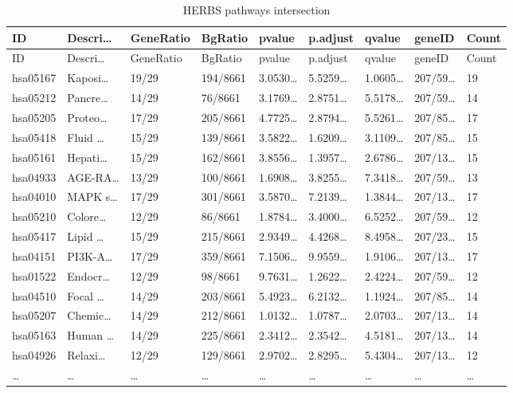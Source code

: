 \documentclass[
]{article}
\begin{document}
\begin{longtable}[]{@{}lllllllll@{}}
\caption{\label{tab:HERBS-pathways-intersection}HERBS pathways intersection}\tabularnewline
\toprule
ID & Descri\ldots{} & GeneRatio & BgRatio & pvalue & p.adjust & qvalue & geneID & Count\tabularnewline
\midrule
\endfirsthead
\toprule
ID & Descri\ldots{} & GeneRatio & BgRatio & pvalue & p.adjust & qvalue & geneID & Count\tabularnewline
\midrule
\endhead
hsa05167 & Kaposi\ldots{} & 19/29 & 194/8661 & 3.0530\ldots{} & 5.5259\ldots{} & 1.0605\ldots{} & 207/59\ldots{} & 19\tabularnewline
hsa05212 & Pancre\ldots{} & 14/29 & 76/8661 & 3.1769\ldots{} & 2.8751\ldots{} & 5.5178\ldots{} & 207/59\ldots{} & 14\tabularnewline
hsa05205 & Proteo\ldots{} & 17/29 & 205/8661 & 4.7725\ldots{} & 2.8794\ldots{} & 5.5261\ldots{} & 207/85\ldots{} & 17\tabularnewline
hsa05418 & Fluid \ldots{} & 15/29 & 139/8661 & 3.5822\ldots{} & 1.6209\ldots{} & 3.1109\ldots{} & 207/85\ldots{} & 15\tabularnewline
hsa05161 & Hepati\ldots{} & 15/29 & 162/8661 & 3.8556\ldots{} & 1.3957\ldots{} & 2.6786\ldots{} & 207/13\ldots{} & 15\tabularnewline
hsa04933 & AGE-RA\ldots{} & 13/29 & 100/8661 & 1.6908\ldots{} & 3.8255\ldots{} & 7.3418\ldots{} & 207/59\ldots{} & 13\tabularnewline
hsa04010 & MAPK s\ldots{} & 17/29 & 301/8661 & 3.5870\ldots{} & 7.2139\ldots{} & 1.3844\ldots{} & 207/13\ldots{} & 17\tabularnewline
hsa05210 & Colore\ldots{} & 12/29 & 86/8661 & 1.8784\ldots{} & 3.4000\ldots{} & 6.5252\ldots{} & 207/59\ldots{} & 12\tabularnewline
hsa05417 & Lipid \ldots{} & 15/29 & 215/8661 & 2.9349\ldots{} & 4.4268\ldots{} & 8.4958\ldots{} & 207/23\ldots{} & 15\tabularnewline
hsa04151 & PI3K-A\ldots{} & 17/29 & 359/8661 & 7.1506\ldots{} & 9.9559\ldots{} & 1.9106\ldots{} & 207/13\ldots{} & 17\tabularnewline
hsa01522 & Endocr\ldots{} & 12/29 & 98/8661 & 9.7631\ldots{} & 1.2622\ldots{} & 2.4224\ldots{} & 207/59\ldots{} & 12\tabularnewline
hsa04510 & Focal \ldots{} & 14/29 & 203/8661 & 5.4923\ldots{} & 6.2132\ldots{} & 1.1924\ldots{} & 207/85\ldots{} & 14\tabularnewline
hsa05207 & Chemic\ldots{} & 14/29 & 212/8661 & 1.0132\ldots{} & 1.0787\ldots{} & 2.0703\ldots{} & 207/13\ldots{} & 14\tabularnewline
hsa05163 & Human \ldots{} & 14/29 & 225/8661 & 2.3412\ldots{} & 2.3542\ldots{} & 4.5181\ldots{} & 207/13\ldots{} & 14\tabularnewline
hsa04926 & Relaxi\ldots{} & 12/29 & 129/8661 & 2.9702\ldots{} & 2.8295\ldots{} & 5.4304\ldots{} & 207/13\ldots{} & 12\tabularnewline
\ldots{} & \ldots{} & \ldots{} & \ldots{} & \ldots{} & \ldots{} & \ldots{} & \ldots{} & \ldots{}\tabularnewline
\bottomrule
\end{longtable}
\end{document}
